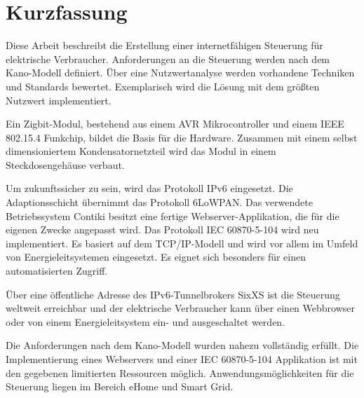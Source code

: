 

\section*{Kurzfassung}

Diese Arbeit beschreibt die Erstellung einer internetfähigen Steuerung für elektrische Verbraucher. Anforderungen an die Steuerung werden nach dem Kano-Modell definiert. Über eine Nutzwertanalyse werden vorhandene Techniken und Standards bewertet. Exemplarisch wird die Lösung mit dem größten Nutzwert implementiert.

Ein Zigbit-Modul, bestehend aus einem AVR Mikrocontroller und einem IEEE 802.15.4 Funkchip, bildet die Basis für die Hardware. Zusammen mit einem selbst dimensioniertem Kondensatornetzteil wird das Modul in einem Steckdosengehäuse verbaut.

Um zukunftssicher zu sein, wird das Protokoll IPv6 eingesetzt. Die Adaptionsschicht übernimmt das Protokoll 6LoWPAN. Das verwendete Betriebssystem Contiki besitzt eine fertige Webserver-Applikation, die für die eigenen Zwecke angepasst wird. Das Protokoll IEC 60870-5-104 wird neu implementiert. Es basiert auf dem TCP/IP-Modell und wird vor allem im Umfeld von Energieleitsystemen eingesetzt. Es eignet sich besonders für einen automatisierten Zugriff.

Über eine öffentliche Adresse des IPv6-Tunnelbrokers SixXS ist die Steuerung weltweit erreichbar und der elektrische Verbraucher kann über einen Webbrowser oder von einem Energieleitsystem ein- und ausgeschaltet werden.

Die Anforderungen nach dem Kano-Modell wurden nahezu vollständig erfüllt. Die Implementierung eines Webservers und einer IEC 60870-5-104 Applikation ist mit den gegebenen limitierten Ressourcen möglich. Anwendungsmöglichkeiten für die Steuerung liegen im Bereich eHome und Smart Grid.

